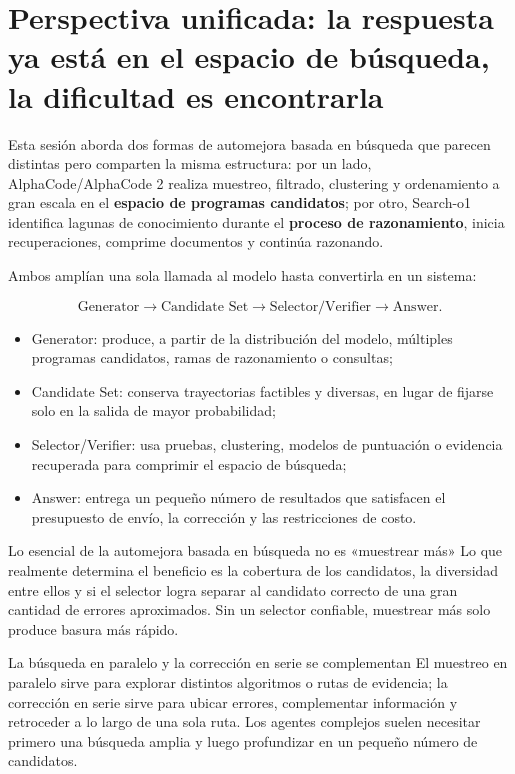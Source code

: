 \documentclass[a4paper]{article}
\begin{document}
\makelecturetitle

\section{Perspectiva unificada: la respuesta ya está en el espacio de búsqueda, la dificultad es encontrarla}

Esta sesión aborda dos formas de automejora basada en búsqueda que parecen distintas pero comparten la misma estructura: por un lado, AlphaCode/AlphaCode 2 realiza muestreo, filtrado, clustering y ordenamiento a gran escala en el \textbf{espacio de programas candidatos}; por otro, Search-o1 identifica lagunas de conocimiento durante el \textbf{proceso de razonamiento}, inicia recuperaciones, comprime documentos y continúa razonando.

Ambos amplían una sola llamada al modelo hasta convertirla en un sistema:

$$
\text{Generator}\rightarrow \text{Candidate Set}\rightarrow
\text{Selector/Verifier}\rightarrow \text{Answer}.
$$

\begin{itemize}
    \item Generator: produce, a partir de la distribución del modelo, múltiples programas candidatos, ramas de razonamiento o consultas;
    \item Candidate Set: conserva trayectorias factibles y diversas, en lugar de fijarse solo en la salida de mayor probabilidad;
    \item Selector/Verifier: usa pruebas, clustering, modelos de puntuación o evidencia recuperada para comprimir el espacio de búsqueda;
    \item Answer: entrega un pequeño número de resultados que satisfacen el presupuesto de envío, la corrección y las restricciones de costo.
\end{itemize}

\begin{importantbox}{Lo esencial de la automejora basada en búsqueda no es «muestrear más»}
Lo que realmente determina el beneficio es la cobertura de los candidatos, la diversidad entre ellos y si el selector logra separar al candidato correcto de una gran cantidad de errores aproximados. Sin un selector confiable, muestrear más solo produce basura más rápido.
\end{importantbox}

\begin{knowledgebox}{La búsqueda en paralelo y la corrección en serie se complementan}
El muestreo en paralelo sirve para explorar distintos algoritmos o rutas de evidencia; la corrección en serie sirve para ubicar errores, complementar información y retroceder a lo largo de una sola ruta. Los agentes complejos suelen necesitar primero una búsqueda amplia y luego profundizar en un pequeño número de candidatos.
\end{knowledgebox}
\end{document}
